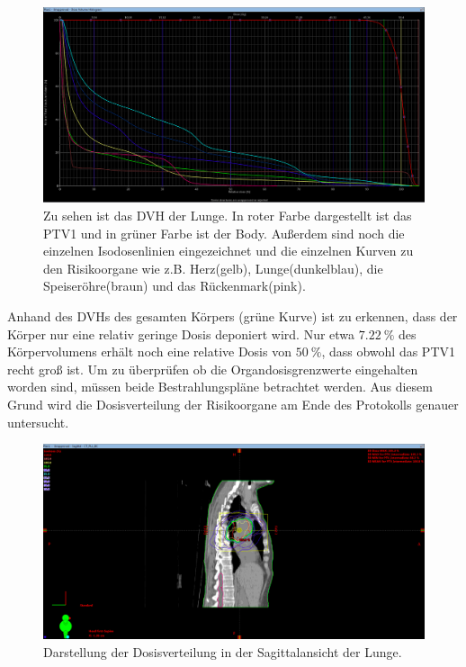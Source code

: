 \begin{figure}[H]
	\centering
	\includegraphics[width=\linewidth]{Bilder/Lunge1_DVH}
	\caption{Zu sehen ist das DVH der Lunge. In roter Farbe dargestellt ist das PTV1 und in grüner Farbe ist der Body. Außerdem sind noch die einzelnen Isodosenlinien eingezeichnet und die einzelnen Kurven zu den Risikoorgane wie z.B. Herz(gelb), Lunge(dunkelblau), die Speiseröhre(braun) und das Rückenmark(pink).}
	\label{fig:lunge1dvh}
\end{figure}

Anhand des DVHs des gesamten Körpers (grüne Kurve) ist zu erkennen, dass der Körper nur eine relativ geringe Dosis deponiert wird. Nur etwa $\SI{7,22}{\percent}$ des Körpervolumens erhält noch eine relative Dosis von $\SI{50}{\percent}$, dass obwohl das PTV1 recht groß ist. Um zu überprüfen ob die Organdosisgrenzwerte eingehalten worden sind, müssen beide Bestrahlungspläne betrachtet werden. Aus diesem Grund wird die Dosisverteilung der Risikoorgane am Ende des Protokolls genauer untersucht.

\begin{figure}[H]
	\centering
	\includegraphics[width=\linewidth]{Bilder/Lunge1_X}
	\caption{Darstellung der Dosisverteilung in der Sagittalansicht der Lunge.}
	\label{fig:lunge1x}
\end{figure}

